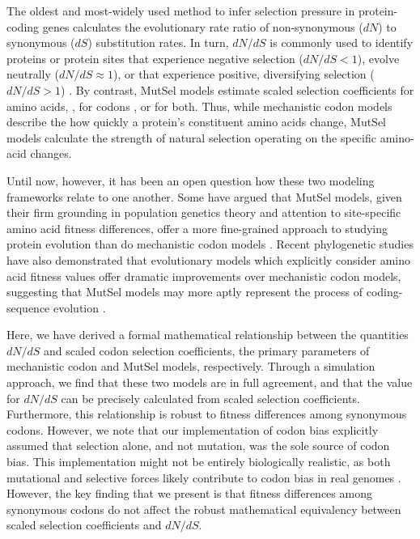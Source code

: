\documentclass[11pt]{article}
\begin{document}


The oldest and most-widely used method to infer selection pressure in protein-coding genes calculates the evolutionary rate ratio of non-synonymous ($dN$) to synonymous ($dS$) substitution rates. In turn, $dN/dS$ is commonly used to identify proteins or protein sites that experience negative selection ($dN/dS<1$), evolve neutrally ($dN/dS\approx1$), or that experience positive, diversifying selection ($dN/dS>1$) \cite{NielsenYang1998,Yangetal2000, KosakovskyPondFrost2005}. By contrast, MutSel models estimate scaled selection coefficients for amino acids, \cite{HalpernBruno1998,YangNielsen2008,Rodrigueetal2010,Tamurietal2012,Tamurietal2014}, for codons \cite{YangNielsen2008}, or for both. Thus, while mechanistic codon models describe the how quickly a protein's constituent amino acids change, MutSel models calculate the strength of natural selection operating on the specific amino-acid changes.  

Until now, however, it has been an open question how these two modeling frameworks relate to one another. Some have argued that MutSel models, given their firm grounding in population genetics theory and attention to site-specific amino acid fitness differences, offer a more fine-grained approach to studying protein evolution than do mechanistic codon models \cite{HalpernBruno1998,Rodrigueetal2010}. Recent phylogenetic studies have also demonstrated that evolutionary models which explicitly consider amino acid fitness values offer dramatic improvements over mechanistic codon models, suggesting that MutSel models may more aptly represent the process of coding-sequence evolution \cite{Bloom2014a, Bloom2014b}. 

Here, we have derived a formal mathematical relationship between the quantities $dN/dS$ and scaled codon selection coefficients, the primary parameters of mechanistic codon and MutSel models, respectively. Through a simulation approach, we find that these two models are in full agreement, and that the value for $dN/dS$ can be precisely calculated from scaled selection coefficients. Furthermore, this relationship is robust to fitness differences among synonymous codons. However, we note that our implementation of codon bias explicitly assumed that selection alone, and not mutation, was the sole source of codon bias. This implementation might not be entirely biologically realistic, as both mutational and selective forces likely contribute to codon bias in real genomes \cite{Blumer1991, Duret2002, HershbergPetrov2008, PlotkinKudla2010}. However, the key finding that we present is that fitness differences among synonymous codons do not affect the robust mathematical equivalency between scaled selection coefficients and $dN/dS$. 
\end{document}
